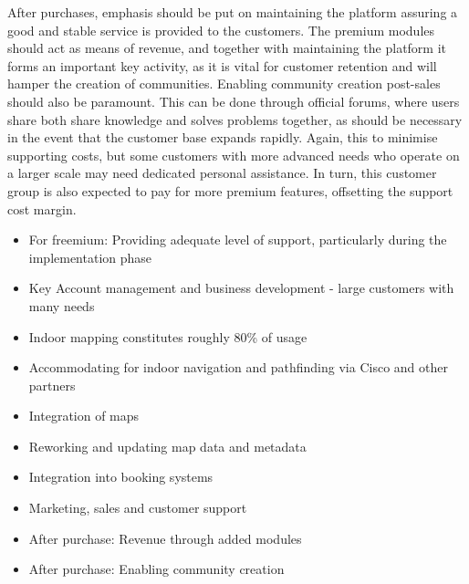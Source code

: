 After purchases, emphasis should be put on maintaining the platform assuring a good and stable service is provided to the customers. The premium modules should act as means of revenue, and together with maintaining the platform it forms an important key activity, as it is vital for customer retention and will hamper the creation of communities. Enabling community creation post-sales should also be paramount. This can be done through official forums, where users share both share knowledge and solves problems together, as should be necessary in the event that the customer base expands rapidly. Again, this to minimise supporting costs, but some customers with more advanced needs who operate on a larger scale may need dedicated personal assistance. In turn, this customer group is also expected to pay for more premium features, offsetting the support cost margin.

\begin{itemize}
    \item For freemium: Providing adequate level of support, particularly during the implementation phase
    \item Key Account management and business development - large customers with many needs
    \item Indoor mapping constitutes roughly 80\% of usage
    \item Accommodating for indoor navigation and pathfinding via Cisco and other partners
    \item Integration of maps
    \item Reworking and updating map data and metadata
    \item Integration into booking systems
    \item Marketing, sales and customer support
    \item After purchase: Revenue through added modules
    \item After purchase: Enabling community creation 
\end{itemize}

